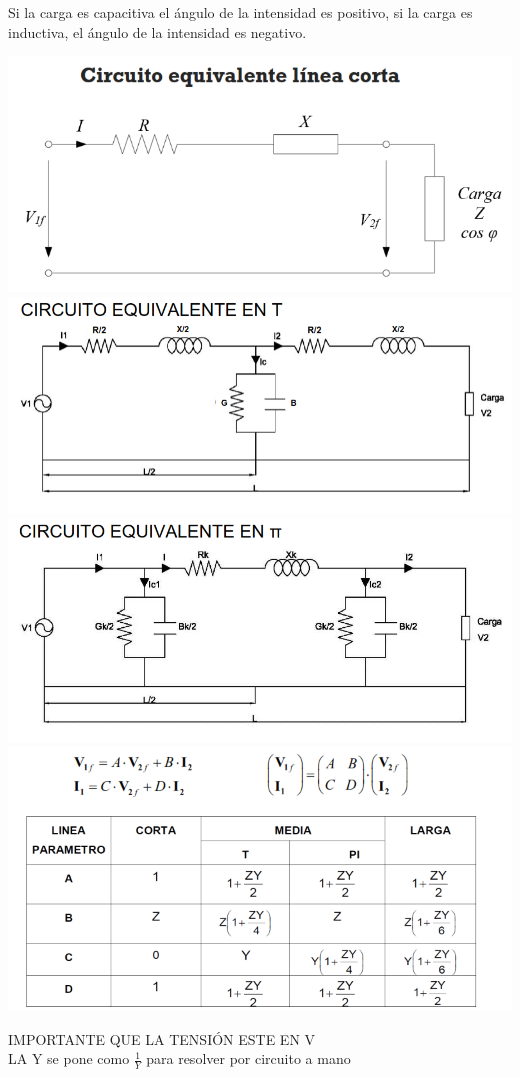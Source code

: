 \documentclass[10pt,a4paper]{article}
\begin{document}
Si la carga es capacitiva el ángulo de la intensidad es positivo, si la carga es inductiva, el ángulo de la intensidad es negativo.\\
\begin{center}
    \includegraphics[scale=0.4]{src/Corta.png}
    \includegraphics[scale=0.4]{src/Equivalente en T.png}
    \includegraphics[scale=0.4]{src/Equivalente en pi.png}
    \includegraphics[scale=0.6]{src/tabla.png}
\end{center}
IMPORTANTE QUE LA TENSIÓN ESTE EN V \\
LA Y se pone como $\frac{1}{Y}$ para resolver por circuito a mano
\end{document}
